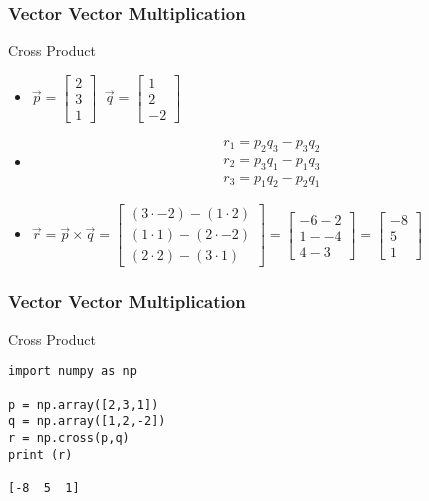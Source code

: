  \begin{frame}[fragile] \frametitle{Vector Vector Multiplication}
Cross Product
 \begin{itemize}
 
\item $\vec{p} = \begin{bmatrix}2 \\ 3 \\ 1 \end{bmatrix}\;\; \vec{q} = \begin{bmatrix}1 \\ 2 \\ -2 \end{bmatrix}$
\item \begin{align}r_{1} = p_{2}q_{3} - p_{3}q_{2} \\ r_{2} = p_{3}q_{1} - p_{1}q_{3} \\ r_{3} = p_{1}q_{2} - p_{2}q_{1} \end{align}
\item $\vec{r} = \vec{p} \times \vec{q} = \begin{bmatrix}(3 \cdot -2) - (1 \cdot 2) \\ (1 \cdot 1) - (2 \cdot -2) \\ (2 \cdot 2) - (3 \cdot 1) \end{bmatrix} = \begin{bmatrix}-6 - 2 \\ 1 - -4 \\ 4 - 3 \end{bmatrix} = \begin{bmatrix}-8 \\ 5 \\ 1 \end{bmatrix}$
\end{itemize}
 
\end{frame}


 \begin{frame}[fragile] \frametitle{Vector Vector Multiplication}

Cross Product
 
 \begin{lstlisting}
import numpy as np

p = np.array([2,3,1])
q = np.array([1,2,-2])
r = np.cross(p,q)
print (r)

[-8  5  1]
 \end{lstlisting}
 

\end{frame}

